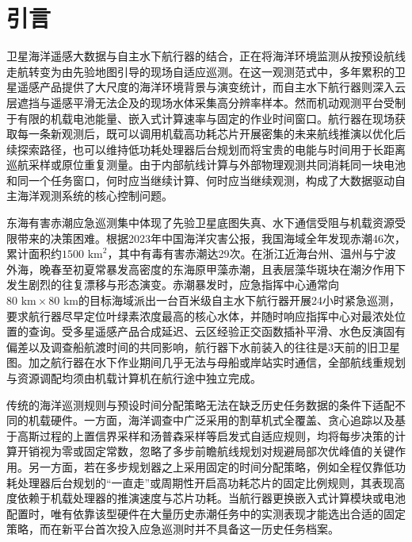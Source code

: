 \section{引言}

卫星海洋遥感大数据与自主水下航行器的结合，正在将海洋环境监测从按预设航线走航转变为由先验地图引导的现场自适应巡测\cite{fossum2019}。在这一观测范式中，多年累积的卫星遥感产品提供了大尺度的海洋环境背景与演变统计，而自主水下航行器则深入云层遮挡与遥感平滑无法企及的现场水体采集高分辨率样本。然而机动观测平台受制于有限的机载电池能量、嵌入式计算速率与固定的作业时间窗口\cite{xiao2020thinking, magnino2026metareasoning}。航行器在现场获取每一条新观测后，既可以调用机载高功耗芯片开展密集的未来航线推演以优化后续探索路径，也可以维持低功耗处理器后台规划而将宝贵的电能与时间用于长距离巡航采样或原位重复测量\cite{horvitz1987reasoning, russell1991right, shen2025thinking}。由于内部航线计算与外部物理观测共同消耗同一块电池和同一个任务窗口，何时应当继续计算、何时应当继续观测，构成了大数据驱动自主海洋观测系统的核心控制问题\cite{hunt2021formalizing}。

东海有害赤潮应急巡测集中体现了先验卫星底图失真、水下通信受阻与机载资源受限带来的决策困难\cite{fossum2019, lou2014diurnal}。根据2023年中国海洋灾害公报，我国海域全年发现赤潮46次，累计面积约$1500\text{ km}^2$，其中有毒有害赤潮达29次\cite{mnr2024bulletin}。在浙江近海台州、温州与宁波外海，晚春至初夏常暴发高密度的东海原甲藻赤潮\cite{zhao2025distinguishing}，且表层藻华斑块在潮汐作用下发生剧烈的往复漂移与形态演变\cite{lou2014diurnal}。赤潮暴发时，应急指挥中心通常向$80\text{ km}\times 80\text{ km}$的目标海域派出一台百米级自主水下航行器开展24小时紧急巡测，要求航行器尽早定位叶绿素浓度最高的核心水体，并随时响应指挥中心对最浓处位置的查询\cite{remus100}。受多星遥感产品合成延迟、云区经验正交函数插补平滑\cite{beckers2003dineof}、水色反演固有偏差\cite{ye2021cocts}以及调查船航渡时间的共同影响，航行器下水前装入的往往是3天前的旧卫星图。加之航行器在水下作业期间几乎无法与母船或岸站实时通信，全部航线重规划与资源调配均须由机载计算机在航行途中独立完成\cite{jetsonorinnx}。

传统的海洋巡测规则与预设时间分配策略无法在缺乏历史任务数据的条件下适配不同的机载硬件。一方面，海洋调查中广泛采用的割草机式全覆盖\cite{galceran2013coverage}、贪心追踪以及基于高斯过程的上置信界采样\cite{srinivas2012gpucb}和汤普森采样\cite{russo2018thompson}等启发式自适应规则，均将每步决策的计算开销视为零或固定常数，忽略了多步前瞻航线规划对规避局部次优峰值的关键作用\cite{hollinger2014sampling}。另一方面，若在多步规划器之上采用固定的时间分配策略，例如全程仅靠低功耗处理器后台规划的“一直走”或周期性开启高功耗芯片的固定比例规则，其表现高度依赖于机载处理器的推演速度与芯片功耗。当航行器更换嵌入式计算模块或电池配置时，唯有依靠该型硬件在大量历史赤潮任务中的实测表现才能选出合适的固定策略，而在新平台首次投入应急巡测时并不具备这一历史任务档案。

